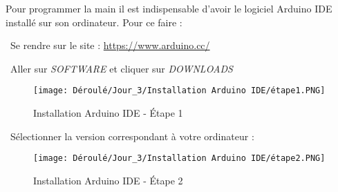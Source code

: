 \begin{flushleft}
Pour programmer la main il est indispensable d'avoir le logiciel Arduino IDE installé sur son ordinateur. Pour ce faire :\vspace{0.4cm}

\textbullet \, Se rendre sur le site : \url{https://www.arduino.cc/}\vspace{0.2cm}

\textbullet \, Aller sur \textit{SOFTWARE} et cliquer sur \textit{DOWNLOADS}

\begin{figure}[!h]
    \centering
    \texttt{[image: Déroulé/Jour\_3/Installation Arduino IDE/étape1.PNG]}
    \caption{Installation Arduino IDE - \'Etape 1}
    \label{fig:my_label}
\end{figure}

\newpage

\textbullet \,  Sélectionner la version correspondant à votre ordinateur :
\begin{figure}[!h]
    \centering
    \texttt{[image: Déroulé/Jour\_3/Installation Arduino IDE/étape2.PNG]}
    \caption[\'Etape 2]{Installation Arduino IDE - \'Etape 2}
    \label{fig:my_label}
\end{figure}
\end{flushleft}